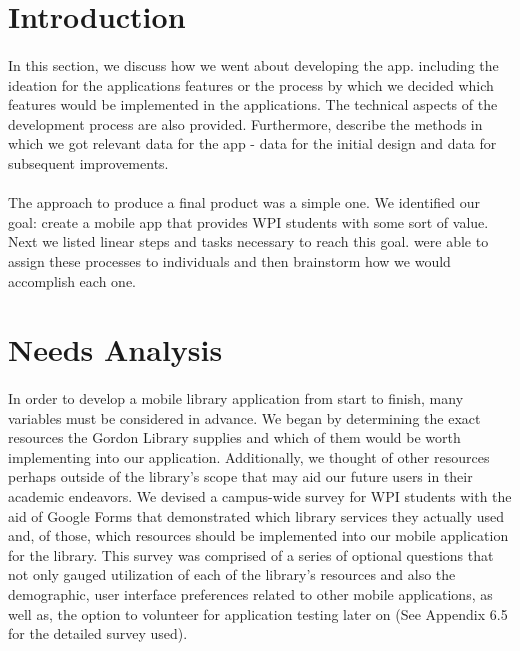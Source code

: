 
    \section{Introduction}
    
    \paragraph{}
    In this section, we discuss how we went about developing the app. including the ideation for the applications features or the process by which we decided which features would be implemented in the applications. The technical aspects of the development process are also provided. Furthermore, describe the methods in which we got relevant data for the app - data for the initial design and data for subsequent improvements.
    
    \paragraph{}
    The approach to produce a final product was a simple one. We identified our goal: create a mobile app that provides WPI students with some sort of value. Next we listed linear steps and tasks necessary to reach this goal.  were able to assign these processes to individuals and then brainstorm how we would accomplish each one.



    \section{Needs Analysis}
    \paragraph{}
    In order to develop a mobile library application from start to finish, many variables must be considered in advance. We began by determining the exact resources the Gordon Library supplies and which of them would be worth implementing into our application. Additionally, we thought of other resources perhaps outside of the library's scope that may aid our future users in their academic endeavors. We devised a campus-wide survey for WPI students with the aid of Google Forms that demonstrated which library services they actually used and, of those, which resources should be implemented into our mobile application for the library. This survey was comprised of a series of optional questions that not only gauged utilization of each of the library's resources and also the demographic, user interface preferences related to other mobile applications, as well as, the option to volunteer for application testing later on (See Appendix 6.5 for the detailed survey used). 
